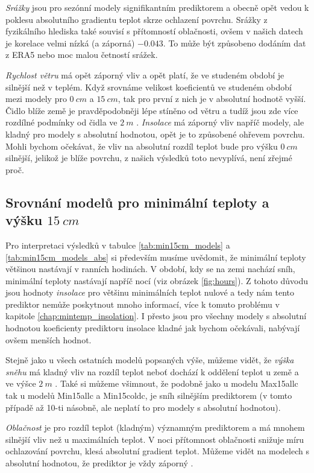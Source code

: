 \textit{Srážky} jsou pro sezónní modely signifikantním prediktorem a obecně opět vedou k poklesu absolutního gradientu teplot skrze ochlazení povrchu. Srážky z fyzikálního hlediska také souvisí s přítomností oblačnosti, ovšem v našich datech je korelace velmi nízká (a záporná) $-0.043$. To může být způsobeno dodáním dat z ERA5 nebo moc malou četností srážek.

\textit{Rychlost větru} má opět záporný vliv a opět platí, že ve studeném období je silnější než v teplém. Když srovnáme velikost koeficientů ve studeném období mezi modely pro $\SI{0}{cm}$ a $\SI{15}{cm}$, tak pro první z nich je v absolutní hodnotě vyšší. Čidlo blíže země je pravděpodobněji lépe stíněno od větru a tudíž jsou zde více rozdílné podmínky od čidla ve $\SI{2}{m}$ \parencite{wind_contrastingmicroclimates}. \textit{Insolace} má záporný vliv napříč modely, ale kladný pro modely s absolutní hodnotou, opět je to způsobené ohřevem povrchu. Mohli bychom očekávat, že vliv na absolutní rozdíl teplot bude pro výšku $\SI{0}{cm}$ silnější, jelikož je blíže povrchu, z našich výsledků toto nevyplívá, není zřejmé proč.

\subsection{Srovnání modelů pro minimální teploty a výšku $\SI{15}{cm}$}
Pro interpretaci výsledků v tabulce \ref{tab:min15cm_models} a \ref{tab:min15cm_models_abs} si především musíme uvědomit, že minimální teploty většinou nastávají v ranních hodinách. V období, kdy se na zemi nachází sníh, minimální teploty nastávají napříč nocí (viz obrázek \ref{fig:hours}). Z tohoto důvodu jsou hodnoty \textit{insolace} pro většinu minimálních teplot nulové a tedy nám tento prediktor nemůže poskytnout mnoho informací, více k tomuto problému v kapitole \ref{chap:mintemp_insolation}. I přesto jsou pro všechny modely s absolutní hodnotou koeficienty prediktoru insolace kladné jak bychom očekávali, nabývají ovšem menších hodnot.

Stejně jako u všech ostatních modelů popsaných výše, můžeme vidět, že \textit{výška sněhu} má kladný vliv na rozdíl teplot neboť dochází k oddělení teplot u země a ve výšce $\SI{2}{m}$ \parencite{snow_deFrenneForestMicroclimates}. Také si můžeme všimnout, že podobně jako u modelu Max15allc tak u modelů Min15allc a Min15coldc, je sníh silnějším prediktorem (v tomto případě až 10-ti násobně, ale neplatí to pro modely s absolutní hodnotou). 

\textit{Oblačnost} je pro rozdíl teplot (kladným) významným prediktorem a má mnohem silnější vliv než u maximálních teplot. V noci přítomnost oblačnosti snižuje míru ochlazování povrchu, klesá absolutní gradient teplot. Můžeme vidět na modelech s absolutní hodnotou, že prediktor je vždy záporný \parencite{cloud_overwinteringclusters}. 

